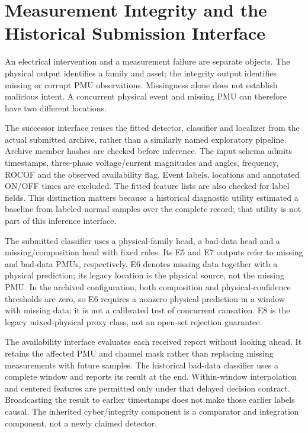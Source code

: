 \section{Measurement Integrity and the Historical Submission Interface}
\label{app:integrity-interface}

An electrical intervention and a measurement failure are separate objects.
The physical output identifies a family and asset; the integrity output
identifies missing or corrupt PMU observations. Missingness alone does not
establish malicious intent. A concurrent physical event and missing PMU can
therefore have two different locations.\AIDraftingCredit{}

The successor interface reuses the fitted detector, classifier and localizer
from the actual submitted archive, rather than a similarly named exploratory
pipeline. Archive member hashes are checked before inference. The input
schema admits timestamps, three-phase voltage/current magnitudes and angles,
frequency, ROCOF and the observed availability flag. Event labels, locations
and annotated ON/OFF times are excluded. The fitted feature lists are also
checked for label fields. This distinction matters because a historical
diagnostic utility estimated a baseline from labeled normal samples over
the complete record; that utility is not part of this inference interface.

The submitted classifier uses a physical-family head, a bad-data head and a
missing/composition head with fixed rules. Its E5 and E7 outputs refer to
missing and bad-data PMUs, respectively. E6 denotes missing data together
with a physical prediction; its legacy location is the physical source,
not the missing PMU. In the archived configuration, both composition and
physical-confidence thresholds are zero, so E6 requires a nonzero physical
prediction in a window with missing data; it is not a calibrated test of
concurrent causation. E8 is the legacy mixed-physical proxy class, not an
open-set rejection guarantee.

The availability interface evaluates each received report without looking
ahead. It retains the affected PMU and channel mask rather than replacing
missing measurements with future samples. The historical bad-data classifier
uses a complete window and reports its result at the end. Within-window
interpolation and centered features are permitted only under that delayed
decision contract. Broadcasting the result to earlier timestamps does not
make those earlier labels causal. The inherited cyber/integrity component
is a comparator and integration component, not a newly claimed detector.

